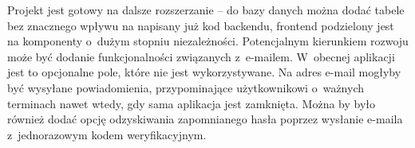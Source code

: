 \documentclass[a4paper,twoside,12pt]{book}
\begin{document}
Projekt jest gotowy na dalsze rozszerzanie -- do bazy danych można dodać tabele bez znacznego wpływu na napisany już kod backendu, frontend podzielony jest na komponenty o~dużym stopniu niezależności. Potencjalnym kierunkiem rozwoju może być dodanie funkcjonalności związanych z~e-mailem. W~obecnej aplikacji jest to opcjonalne pole, które nie jest wykorzystywane. Na adres e-mail mogłyby być wysyłane powiadomienia, przypominające użytkownikowi o~ważnych terminach nawet wtedy, gdy sama aplikacja jest zamknięta. Można by było również dodać opcję odzyskiwania zapomnianego hasła poprzez wysłanie e-maila z~jednorazowym kodem weryfikacyjnym.


\backmatter

\printbibliography           %
\end{document}
